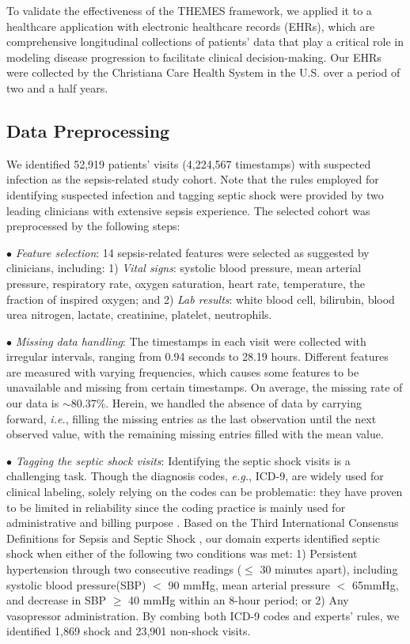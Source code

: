 \documentclass{article}
\begin{document}
To validate the effectiveness of the THEMES framework, we applied it to a healthcare application with electronic healthcare records (EHRs), which are comprehensive longitudinal collections of patients' data that play a critical role in modeling disease progression to facilitate clinical decision-making. Our EHRs were collected by the Christiana Care Health System in the U.S. over a period of two and a half years.


\subsection{Data Preprocessing}
\label{sec:preprocessing}
We identified 52,919 patients' visits (4,224,567 timestamps) with suspected infection as the sepsis-related study cohort. Note that the rules employed for identifying suspected infection and tagging septic shock were provided by two leading clinicians with extensive sepsis experience. The selected cohort was preprocessed by the following steps: 

\noindent $\bullet$ \textit{Feature selection}: 14 sepsis-related features were selected as suggested by clinicians, including: 
1) \textit{Vital signs}: systolic blood pressure, mean arterial pressure, respiratory rate, oxygen saturation, heart rate, temperature, the fraction of inspired oxygen; and  
2) \textit{Lab results}: white blood cell, bilirubin, blood urea nitrogen, lactate, creatinine, platelet, neutrophils.  

\noindent $\bullet$ \textit{Missing data handling}: 
The timestamps in each visit were collected with irregular intervals, ranging from 0.94 seconds to 28.19 hours. Different features are measured with varying frequencies, which causes some features to be unavailable and missing from certain timestamps. On average, the missing rate of our data is $\sim$80.37\%. Herein, we handled the absence of data by carrying forward, \textit{i.e.}, filling the missing entries as the last observation until the next observed value, with the remaining missing entries filled with the mean value. 

\noindent $\bullet$ \textit{Tagging the septic shock visits}: 
Identifying the septic shock visits is a challenging task. Though the diagnosis codes, \textit{e.g.}, ICD-9, are widely used for clinical labeling, solely relying on the codes can be problematic: they have proven to be limited in reliability since the coding practice is mainly used for administrative and billing purpose \cite{zhang2019attain}. 
Based on the Third International Consensus Definitions for Sepsis and Septic Shock \cite{singer2016third}, our domain experts identified septic shock when either of the following two conditions was met: 
1) Persistent hypertension through two consecutive readings ($\le$ 30 minutes apart), including systolic blood pressure(SBP) $<$ 90 mmHg, mean arterial pressure $<$ 65mmHg, and decrease in SBP $\geq$ 40 mmHg within an 8-hour period; or 2) Any vasopressor administration. By combing both ICD-9 codes and experts' rules, we identified 1,869 shock and 23,901 non-shock visits.
\end{document}
